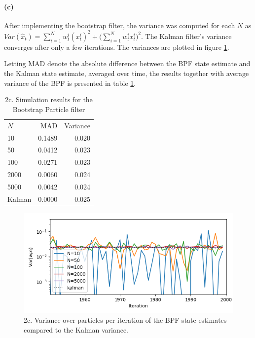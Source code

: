 \documentclass{article}
\begin{document}
\paragraph{(c)} After implementing the bootstrap filter, the variance was computed for each $N$ as $Var(\hat{x}_t) = \sum_{i=1}^{N}w_t^i (x_t^i)^2 + \big(\sum_{i=1}^{N} w_t^i x_t^i \big)^2$. The Kalman filter's variance converges after only a few iterations. The variances are plotted in figure \ref{fig:2_c}.

Letting MAD denote the absolute difference between the BPF state estimate and the Kalman state estimate, averaged over time, the results together with average variance of the BPF is presented in table \ref{tab:2c}.
\begin{table}
	\centering
	\begin{tabular}{lrr}\hline
		$N$ & MAD 		& Variance 	\\
		10 	& 0.1489	& 0.020  	\\
		50	& 0.0412	& 0.023		\\
		100	& 0.0271	& 0.023		\\
		2000& 0.0060	& 0.024		\\
		5000& 0.0042 	& 0.024		\\
		Kalman & 0.0000 & 0.025		\\\hline
	\end{tabular}
	\caption{2c. Simulation results for the Bootstrap Particle filter}
	\label{tab:2c}
\end{table}

\begin{figure}[h]
	\centering
	\includegraphics[width=.7\linewidth]{2_c}
	\caption{2c. Variance over particles per iteration of the BPF state estimates compared to the Kalman variance.}
	\label{fig:2_c}
\end{figure}
\end{document}
